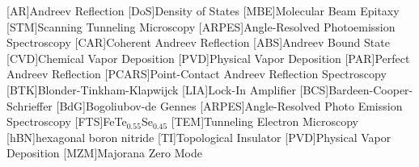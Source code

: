 [AR]{Andreev Reflection}
[DoS]{Density of States}
[MBE]{Molecular Beam Epitaxy}
[STM]{Scanning Tunneling Microscopy}
[ARPES]{Angle-Resolved Photoemission Spectroscopy}
[CAR]{Coherent Andreev Reflection}
[ABS]{Andreev Bound State}
[CVD]{Chemical Vapor Deposition}
[PVD]{Physical Vapor Deposition}
[PAR]{Perfect Andreev Reflection}
[PCARS]{Point-Contact Andreev Reflection Spectroscopy}
[BTK]{Blonder-Tinkham-Klapwijck}
[LIA]{Lock-In Amplifier}
[BCS]{Bardeen-Cooper-Schrieffer}
[BdG]{Bogoliubov-de Gennes}
[ARPES]{Angle-Resolved Photo Emission Spectroscopy}
[FTS]{FeTe$_{0.55}$Se$_{0.45}$}
[TEM]{Tunneling Electron Microscopy}
[hBN]{hexagonal boron nitride}
[TI]{Topological Insulator}
[PVD]{Physical Vapor Deposition}
[MZM]{Majorana Zero Mode}